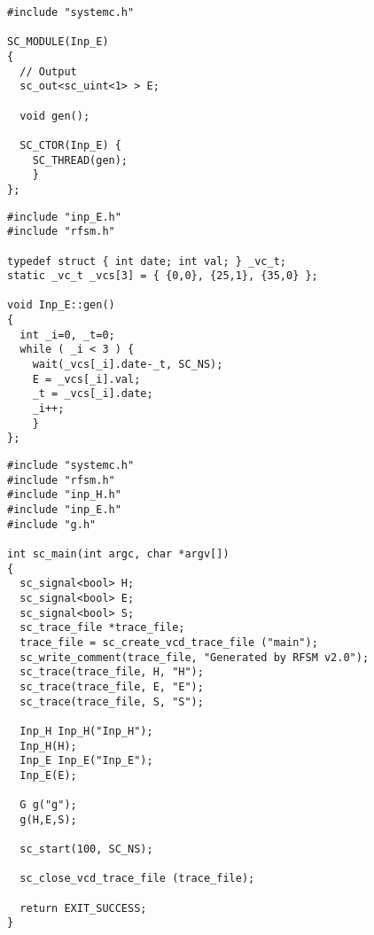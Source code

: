 \begin{lstlisting}[language=systemc,frame=single,numbers=none,basicstyle=\small,caption=File inp_E.h]
#include "systemc.h"

SC_MODULE(Inp_E)
{
  // Output
  sc_out<sc_uint<1> > E;

  void gen();

  SC_CTOR(Inp_E) {
    SC_THREAD(gen);
    }
};
\end{lstlisting}

\begin{lstlisting}[language=systemc,frame=single,numbers=none,basicstyle=\small,caption=File inp_E.cpp]
#include "inp_E.h"
#include "rfsm.h"

typedef struct { int date; int val; } _vc_t;
static _vc_t _vcs[3] = { {0,0}, {25,1}, {35,0} };

void Inp_E::gen()
{
  int _i=0, _t=0;
  while ( _i < 3 ) {
    wait(_vcs[_i].date-_t, SC_NS);
    E = _vcs[_i].val;
    _t = _vcs[_i].date;
    _i++;
    }
};
\end{lstlisting}

\begin{lstlisting}[language=systemc,frame=single,numbers=none,basicstyle=\small,caption=File main.cpp]
#include "systemc.h"
#include "rfsm.h"
#include "inp_H.h"
#include "inp_E.h"
#include "g.h"

int sc_main(int argc, char *argv[])
{
  sc_signal<bool> H;
  sc_signal<bool> E;
  sc_signal<bool> S;
  sc_trace_file *trace_file;
  trace_file = sc_create_vcd_trace_file ("main");
  sc_write_comment(trace_file, "Generated by RFSM v2.0");
  sc_trace(trace_file, H, "H");
  sc_trace(trace_file, E, "E");
  sc_trace(trace_file, S, "S");

  Inp_H Inp_H("Inp_H");
  Inp_H(H);
  Inp_E Inp_E("Inp_E");
  Inp_E(E);

  G g("g");
  g(H,E,S);

  sc_start(100, SC_NS);

  sc_close_vcd_trace_file (trace_file);

  return EXIT_SUCCESS;
}
\end{lstlisting}

